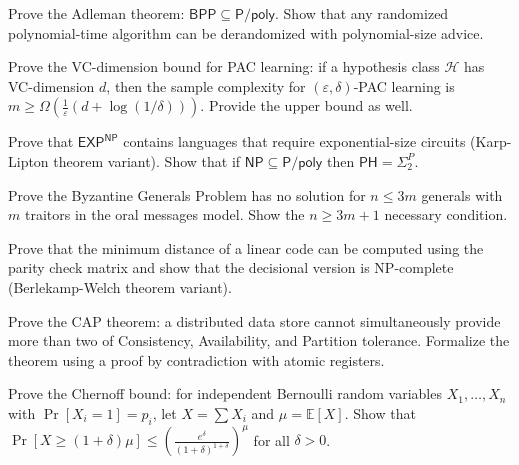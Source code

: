 \documentclass[12pt,a4paper]{exam}
\begin{document}
\begin{questions}

\question[4]
Prove the Adleman theorem: $\mathsf{BPP} \subseteq \mathsf{P}/\mathsf{poly}$. Show that any randomized polynomial-time algorithm can be derandomized with polynomial-size advice.

\vspace{0.3cm}

\question[2]
Prove the VC-dimension bound for PAC learning: if a hypothesis class $\mathcal{H}$ has VC-dimension $d$, then the sample complexity for $(\varepsilon,\delta)$-PAC learning is $m \geq \Omega(\frac{1}{\varepsilon}(d + \log(1/\delta)))$. Provide the upper bound as well.

\vspace{0.3cm}

\question[4]
Prove that $\mathsf{EXP}^{\mathsf{NP}}$ contains languages that require exponential-size circuits (Karp-Lipton theorem variant). Show that if $\mathsf{NP} \subseteq \mathsf{P}/\mathsf{poly}$ then $\mathsf{PH} = \Sigma_2^P$.

\vspace{0.3cm}

\question[3]
Prove the Byzantine Generals Problem has no solution for $n \leq 3m$ generals with $m$ traitors in the oral messages model. Show the $n \geq 3m+1$ necessary condition.

\vspace{0.3cm}

\question[3]
Prove that the minimum distance of a linear code can be computed using the parity check matrix and show that the decisional version is NP-complete (Berlekamp-Welch theorem variant).

\vspace{0.3cm}

\question[4]
Prove the CAP theorem: a distributed data store cannot simultaneously provide more than two of Consistency, Availability, and Partition tolerance. Formalize the theorem using a proof by contradiction with atomic registers.

\vspace{0.3cm}

\question[3]
Prove the Chernoff bound: for independent Bernoulli random variables $X_1,\ldots,X_n$ with $\Pr[X_i = 1] = p_i$, let $X = \sum X_i$ and $\mu = \mathbb{E}[X]$. Show that $\Pr[X \geq (1+\delta)\mu] \leq (\frac{e^\delta}{(1+\delta)^{1+\delta}})^\mu$ for all $\delta > 0$.

\vspace{0.3cm}


\end{questions}
\end{document}
